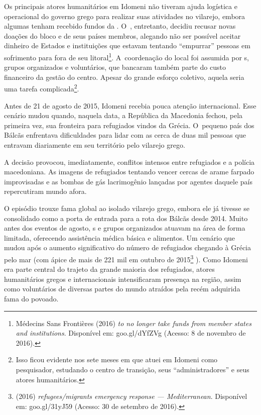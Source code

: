 Os principais atores humanitários em Idomeni não tiveram ajuda logística
e operacional do governo grego para realizar suas atividades no
vilarejo, embora algumas tenham recebido fundos da . O~,
entretanto, decidiu recusar novas doações do bloco e de seus países
membros, alegando não ser possível aceitar dinheiro de Estados e
instituições que estavam tentando ``empurrar'' pessoas em sofrimento
para fora de seu litoral\footnote{ Médecins Sans Frontières (2016) \emph{ to no
longer take funds from  member states and institutions}. Disponível
em:
goo.gl/dYfZVg
(Acesso: 8 de novembro de 2016).}. A~coordenação do local foi
assumida por s, grupos organizados e voluntários, que bancaram também
parte do custo financeiro da gestão do centro. Apesar do grande esforço
coletivo, aquela seria uma tarefa complicada\footnote{ Isso ficou evidente nos sete meses em que atuei em
Idomeni como pesquisador, estudando o centro de transição, seus
``administradores'' e seus atores humanitários.}.

Antes de 21 de agosto de 2015, Idomeni recebia pouca atenção
internacional. Esse cenário mudou quando, naquela data, a República da
Macedonia fechou, pela primeira vez, sua fronteira para refugiados vindos da Grécia.
O~pequeno país dos Bálcãs enfrentava dificuldades para
lidar com as cerca de duas mil pessoas que entravam diariamente em seu
território pelo vilarejo grego.

A decisão provocou, imediatamente, conflitos intensos entre
refugiados e a polícia macedoniana. As imagens de refugiados tentando
vencer cercas de arame farpado improvisadas e as bombas de gás
lacrimogênio lançadas por agentes daquele país repercutiram mundo afora.

O episódio trouxe fama global ao isolado vilarejo grego, embora ele já
tivesse se consolidado como a porta de entrada para a rota dos Bálcãs
desde 2014. Muito antes dos eventos de agosto, s e grupos organizados
atuavam na área de forma limitada, oferecendo assistência médica básica
e alimentos. Um cenário que mudou após o aumento significativo do número
de refugiados chegando à Grécia pelo mar (com ápice de mais de 221 mil
em outubro de 2015\footnote{  (2016) \emph{ refugees/migrants emergency
response --- Mediterranean}. Disponível em:
goo.gl/31yJ59
(Acesso: 30 de setembro
de 2016).} ). Como Idomeni era parte central do
trajeto da grande maioria dos refugiados, atores humanitários gregos e
internacionais intensificaram presença na região, assim como voluntários
de diversas partes do mundo atraídos pela recém adquirida fama do
povoado.

